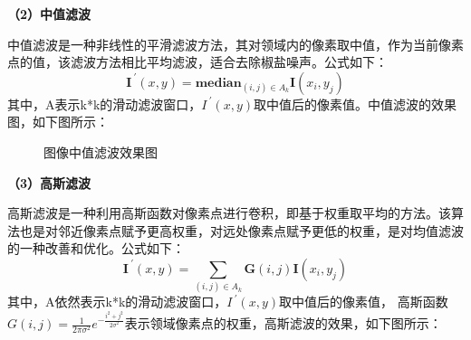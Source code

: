 \textbf{（2）中值滤波}

中值滤波是一种非线性的平滑滤波方法，其对领域内的像素取中值，作为当前像素点的值，该滤波方法相比平均滤波，适合去除椒盐噪声。公式如下：
\begin{equation}
	\bm{I^{~'}}(x, y) = \bm{median}_{(i, j)\in A_k}\bm{I}(x_i, y_j)
\end{equation}
其中，A表示k*k的滑动滤波窗口，$I^{~'}(x, y)$取中值后的像素值。中值滤波的效果图，如下图所示：

\begin{figure}[H]
	\caption{图像中值滤波效果图}
	\label{median}
\end{figure}

\textbf{（3）高斯滤波}

高斯滤波是一种利用高斯函数对像素点进行卷积，即基于权重取平均的方法。该算法也是对邻近像素点赋予更高权重，对远处像素点赋予更低的权重，是对均值滤波的一种改善和优化。公式如下：
\begin{equation}
	\bm{I^{~'}}(x, y)= \sum_{(i, j)\in A_k}\bm{G}(i, j)\bm{I}(x_i, y_j)
\end{equation}
其中，A依然表示k*k的滑动滤波窗口，$I^{~'}(x, y)$取中值后的像素值，
高斯函数$G(i, j) = \frac{1}{2\pi\sigma^2}e^{-\frac{i^2+j^2}{2\sigma^2}}$表示领域像素点的权重，高斯滤波的效果，如下图所示：

